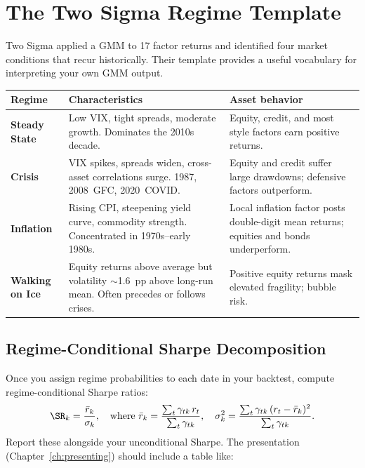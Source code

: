 \section{The Two Sigma Regime Template}
\label{sec:regimes:twosigma}

Two Sigma applied a GMM to 17 factor returns and identified four market
conditions that recur historically.  Their template provides a useful
vocabulary for interpreting your own GMM output.

\begin{keyidea}
\begin{center}
\begin{tabular}{p{2.8cm} p{5.5cm} p{5.2cm}}
  \toprule
  \textbf{Regime} & \textbf{Characteristics} & \textbf{Asset behavior} \\
  \midrule
  \textbf{Steady State} &
    Low VIX, tight spreads, moderate growth.  Dominates the 2010s decade. &
    Equity, credit, and most style factors earn positive returns. \\[4pt]
  \textbf{Crisis} &
    VIX spikes, spreads widen, cross-asset correlations surge.
    1987, 2008~GFC, 2020~COVID. &
    Equity and credit suffer large drawdowns; defensive factors outperform. \\[4pt]
  \textbf{Inflation} &
    Rising CPI, steepening yield curve, commodity strength.
    Concentrated in 1970s--early 1980s. &
    Local inflation factor posts double-digit mean returns; equities and
    bonds underperform. \\[4pt]
  \textbf{Walking on Ice} &
    Equity returns above average but volatility $\sim$1.6~pp above
    long-run mean.  Often precedes or follows crises. &
    Positive equity returns mask elevated fragility; bubble risk. \\
  \bottomrule
\end{tabular}
\end{center}
\end{keyidea}

\subsection{Regime-Conditional Sharpe Decomposition}
\label{sec:regimes:conditional-sharpe}

Once you assign regime probabilities to each date in your backtest, compute
regime-conditional Sharpe ratios:
\begin{equation}
  \SR_k = \frac{\bar{r}_k}{\sigma_k}, \quad
  \text{where } \bar{r}_k = \frac{\sum_t \gamma_{tk}\, r_t}
  {\sum_t \gamma_{tk}}, \quad
  \sigma_k^2 = \frac{\sum_t \gamma_{tk}\,(r_t - \bar{r}_k)^2}
  {\sum_t \gamma_{tk}}.
  \label{eq:regime-sharpe}
\end{equation}
Report these alongside your unconditional Sharpe.  The presentation
(Chapter~\ref{ch:presenting}) should include a table like:

